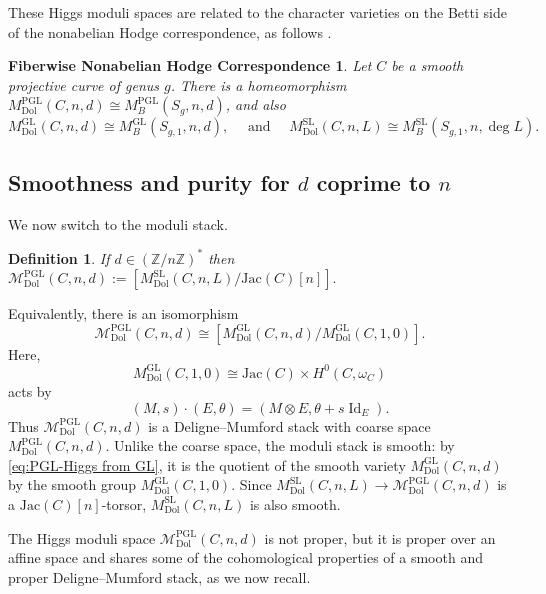 \documentclass[11pt,reqno]{amsart}
\theoremstyle{plain} %
\newtheorem*{NAHC}{Fiberwise Nonabelian Hodge Correspondence}
\newtheorem{definition}[theorem]{Definition}
\theoremstyle{definition}
\newcommand{\M}{\mathcal{M}}
\newcommand{\ZZ}{\mathbb{Z}}
\DeclareMathOperator{\Id}{Id}
\DeclareMathOperator{\GL}{GL}
\DeclareMathOperator{\SL}{SL}
\DeclareMathOperator{\PGL}{PGL}
\newcommand{\Dol}{\mathrm{Dol}}
\newcommand{\Jac}{\mathrm{Jac}}
\begin{document}
These Higgs moduli spaces are related to the character varieties on the Betti side of the nonabelian Hodge correspondence, as follows \cite[Theorem 4.3]{Hausel-handbook}.

\begin{NAHC}
    Let $C$ be a smooth projective curve of genus $g$. There is a homeomorphism 
    $M^{\PGL}_{\Dol}(C,n,d) \cong M^{\PGL}_B(S_g,n,d)$, and also 
    $$M^{\GL}_{\Dol}(C,n,d) \cong M^{\GL}_B(S_{g,1},n,d), \quad \mbox{ and } \quad M^{\SL}_{\Dol}(C,n,L) \cong M^{\SL}_B(S_{g,1},n,\deg L).$$
\end{NAHC}


\subsection{Smoothness and purity for \texorpdfstring{$d$}{d} coprime to \texorpdfstring{$n$}{n}}

We now switch to the moduli stack.

\begin{definition}
If $d \in (\ZZ/n\ZZ)^*$ then
$\M^{\PGL}_{\Dol}(C,n,d) := [M^{\SL}_{\Dol}(C,n,L)/\Jac(C)[n]].$
\end{definition}

Equivalently, there is an isomorphism
\begin{equation} \label{eq:PGL-Higgs from GL}
\M^{\PGL}_{\Dol}(C,n,d) \cong [M_{\Dol}^{\GL}(C,n,d)/M^{\GL}_{\Dol}(C,1,0)].
\end{equation}
Here,
\[
M^{\GL}_{\Dol}(C,1,0) \cong \Jac(C) \times H^0(C,\omega_C)
\]
acts by
\[
(M,s)\cdot(E,\theta)=(M\otimes E,\theta+s\Id_E).
\]
Thus $\M^{\PGL}_{\Dol}(C,n,d)$ is a Deligne--Mumford stack with coarse space $M^{\PGL}_{\Dol}(C,n,d)$. Unlike the coarse space, the moduli stack is smooth: by \eqref{eq:PGL-Higgs from GL}, it is the quotient of the smooth variety $M^{\GL}_{\Dol}(C,n,d)$ \cite[Proposition~7.4]{Nitsure} by the smooth group $M^{\GL}_{\Dol}(C,1,0)$. Since $M^{\SL}_{\Dol}(C,n,L)\to\M^{\PGL}_{\Dol}(C,n,d)$ is a $\Jac(C)[n]$-torsor, $M^{\SL}_{\Dol}(C,n,L)$ is also smooth. 

The Higgs moduli space $\M^{\PGL}_{\Dol}(C,n,d)$ is not proper, but it is proper over an affine space and shares some of the cohomological properties of a smooth and proper Deligne--Mumford stack, as we now recall.
\end{document}
